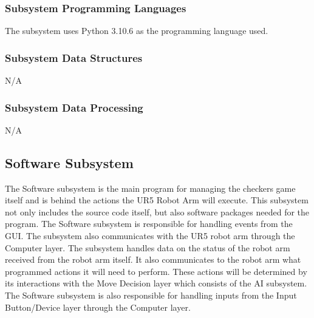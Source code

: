 \subsubsection{Subsystem Programming Languages}
The subsystem uses Python 3.10.6 as the programming language used.

\subsubsection{Subsystem Data Structures}
N/A

\subsubsection{Subsystem Data Processing}
N/A



\subsection{Software Subsystem}
The Software subsystem is the main program for managing the checkers game itself and is behind the actions the UR5 Robot Arm will execute. This subsystem not only includes the source code itself, but also software packages needed for the program. The Software subsystem is responsible for handling events from the GUI. The subsystem also communicates with the UR5 robot arm through the Computer layer. The subsystem handles data on the status of the robot arm received from the robot arm itself. It also communicates to the robot arm what programmed actions it will need to perform. These actions will be determined by its interactions with the Move Decision layer which consists of the AI subsystem. The Software subsystem is also responsible for handling inputs from the Input Button/Device layer through the Computer layer.


